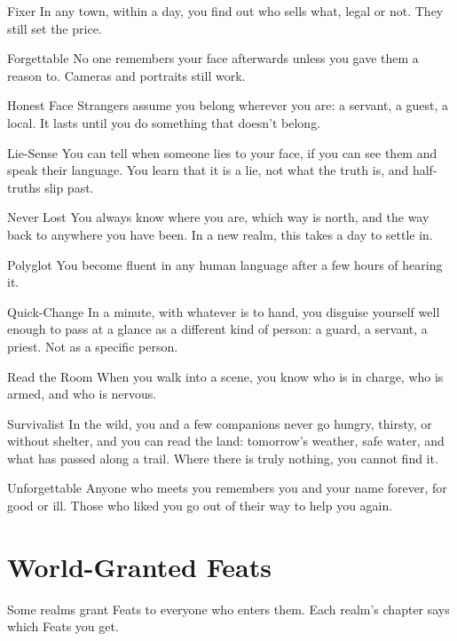 \begin{feat}{Fixer}
In any town, within a day, you find out who sells what, legal or not.
They still set the price.
\end{feat}

\begin{feat}{Forgettable}
No one remembers your face afterwards unless you gave them a reason to.
Cameras and portraits still work.
\end{feat}

\begin{feat}{Honest Face}
Strangers assume you belong wherever you are: a servant, a guest, a
local. It lasts until you do something that doesn't belong.
\end{feat}

\begin{feat}{Lie-Sense}
You can tell when someone lies to your face, if you can see them and
speak their language. You learn that it is a lie, not what the truth
is, and half-truths slip past.
\end{feat}

\begin{feat}{Never Lost}
You always know where you are, which way is north, and the way back to
anywhere you have been. In a new realm, this takes a day to settle in.
\end{feat}

\begin{feat}{Polyglot}
You become fluent in any human language after a few hours of hearing
it.
\end{feat}

\begin{feat}{Quick-Change}
In a minute, with whatever is to hand, you disguise yourself well enough
to pass at a glance as a different kind of person: a guard, a servant, a
priest. Not as a specific person.
\end{feat}

\begin{feat}{Read the Room}
When you walk into a scene, you know who is in charge, who is armed, and
who is nervous.
\end{feat}

\begin{feat}{Survivalist}
In the wild, you and a few companions never go hungry, thirsty, or
without shelter, and you can read the land: tomorrow's weather, safe
water, and what has passed along a trail. Where there is truly nothing,
you cannot find it.
\end{feat}

\begin{feat}{Unforgettable}
Anyone who meets you remembers you and your name forever, for good or
ill. Those who liked you go out of their way to help you again.
\end{feat}

\renewcommand{\realmaccent}{atrAccent}
\section{World-Granted Feats}

Some realms grant Feats to everyone who enters them. Each realm's
chapter says which Feats you get.
